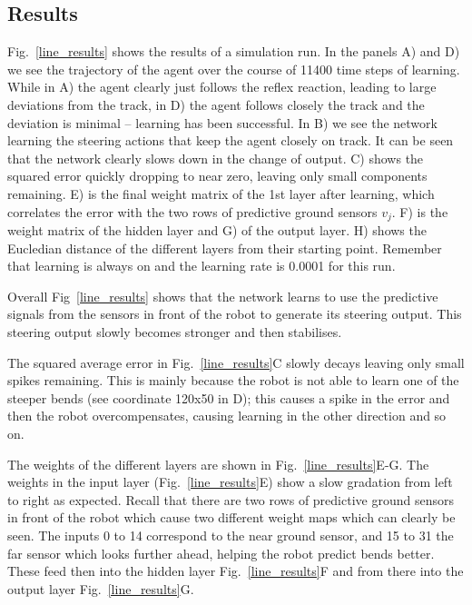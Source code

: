 \documentclass{llncs}
\begin{document}
\subsection{Results}
Fig.~\ref{line_results} shows the results of a simulation run. In the panels
A) and D) we see the trajectory of the agent over the course of 11400 time steps 
of learning. While in A) the agent clearly
just follows the reflex reaction, leading to large deviations from the track,
in D) the agent follows closely the track and the deviation is minimal --
learning has been successful. In B) we see the network learning the steering actions that keep the agent closely on track.
It can be seen that the network clearly slows down in the change of output.
C) shows the squared error quickly dropping to near zero, leaving only small 
components remaining. E) is the final weight matrix of the 1st layer after learning, 
which correlates the error with the two rows of
predictive ground sensors $v_j$. F) is the weight matrix of the hidden layer and G)
of the output layer. H) shows the Eucledian distance of the
different layers from their starting point. Remember that learning is
always on and the learning rate is 0.0001 for this run.

Overall Fig~\ref{line_results} shows that the network learns to use
the predictive signals from the sensors in front of the robot to
generate its steering output. This steering output slowly becomes
stronger and then stabilises.

The squared average error in Fig.~\ref{line_results}C slowly decays
leaving only small spikes remaining. This is mainly because
the robot is not able to learn one of the steeper bends (see
coordinate 120x50 in D); this causes a spike in the error and
then the robot overcompensates, causing learning in the
other direction and so on.

The weights of the different layers are shown in
Fig.~\ref{line_results}E-G.  The weights in the input layer
(Fig.~\ref{line_results}E) show a slow gradation  from left to right as
expected. Recall that there are two rows of predictive ground
sensors in front of the robot which cause two different weight maps
which can clearly be seen. The inputs 0 to 14 correspond to the near
ground sensor, and 15 to 31 the far sensor which looks further ahead, 
helping the robot predict bends better. These feed then into the 
hidden layer Fig.~\ref{line_results}F
and from there into the output layer Fig.~\ref{line_results}G.
\end{document}
